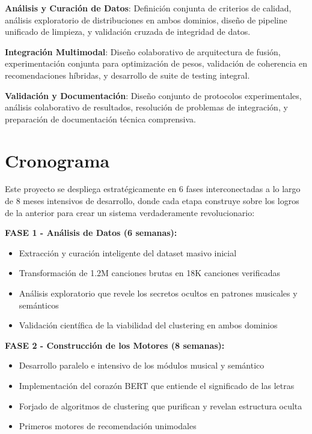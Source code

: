 \documentclass[12pt,a4paper]{article}
\begin{document}
\textbf{Análisis y Curación de Datos}: Definición conjunta de criterios de calidad, análisis exploratorio de distribuciones en ambos dominios, diseño de pipeline unificado de limpieza, y validación cruzada de integridad de datos.

\textbf{Integración Multimodal}: Diseño colaborativo de arquitectura de fusión, experimentación conjunta para optimización de pesos, validación de coherencia en recomendaciones híbridas, y desarrollo de suite de testing integral.

\textbf{Validación y Documentación}: Diseño conjunto de protocolos experimentales, análisis colaborativo de resultados, resolución de problemas de integración, y preparación de documentación técnica comprensiva.

\section{Cronograma}

Este proyecto se despliega estratégicamente en 6 fases interconectadas a lo largo de 8 meses intensivos de desarrollo, donde cada etapa construye sobre los logros de la anterior para crear un sistema verdaderamente revolucionario:

\textbf{FASE 1 - Análisis de Datos (6 semanas):}
\begin{itemize}
    \item Extracción y curación inteligente del dataset masivo inicial
    \item Transformación de 1.2M canciones brutas en 18K canciones verificadas
    \item Análisis exploratorio que revele los secretos ocultos en patrones musicales y semánticos
    \item Validación científica de la viabilidad del clustering en ambos dominios
\end{itemize}

\textbf{FASE 2 - Construcción de los Motores (8 semanas):}
\begin{itemize}
    \item Desarrollo paralelo e intensivo de los módulos musical y semántico
    \item Implementación del corazón BERT que entiende el significado de las letras
    \item Forjado de algoritmos de clustering que purifican y revelan estructura oculta
    \item Primeros motores de recomendación unimodales
\end{itemize}
\end{document}
